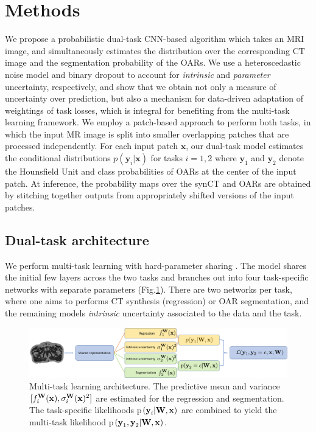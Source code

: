 \section{Methods}
We propose a probabilistic dual-task CNN-based algorithm which takes an MRI image, and simultaneously estimates the distribution over the corresponding CT image and the segmentation probability of the OARs. We use a heteroscedastic noise model and binary dropout to account for \textit{intrinsic} and \textit{parameter} uncertainty, respectively, and show that we obtain not only a measure of uncertainty over prediction, but also a mechanism for data-driven adaptation of weightings of task losses, which is integral for benefiting from the multi-task learning framework. We employ a patch-based approach to perform both tasks, in which the input MR image is split into smaller overlapping patches that are processed independently. For each input patch $\mathbf{x}$, our dual-task model estimates the conditional distributions $p(\mathbf{y}_i|\mathbf{x})$ for tasks $i=1,2$ where $\mathbf{y}_1$ and $\mathbf{y}_2$ denote the Hounsfield Unit and class probabilities of OARs at the center of the input patch. At inference, the probability maps over the synCT and OARs are obtained by stitching together outputs from appropriately shifted versions of the input patches.

\subsection{Dual-task architecture}
We perform multi-task learning with hard-parameter sharing \cite{Caruana1993MultitaskLA}. The model shares the initial few layers across the two tasks and branches out into four task-specific networks with separate parameters (Fig.\ref{fig:diagram}). There are two networks per task, where one aims to performs CT synthesis (regression) or OAR segmentation, and the remaining models \emph{intrinsic} uncertainty associated to the data and the task.
	\begin{figure}[!b]
		\centering
\includegraphics[height=0.185\textwidth]{chapter_5/figures/final_for_ryu_MT.pdf}
		\caption{Multi-task learning architecture. The predictive mean and variance $[f^{\mathbf{W}}_i(\text{\textbf{x}}), \sigma_{i}^{\mathbf{W}}(\text{\textbf{x}})^{2}]$ are estimated for the regression and segmentation. The task-specific likelihoods p$\left(\text{\textbf{y}}_{i}|\text{\textbf{W}},\text{\textbf{x}}\right)$ are combined to yield the multi-task likelihood p$\left(\text{\textbf{y}}_{1}, \text{\textbf{y}}_{2}|\text{\textbf{W}},\mathbf{x}\right)$.} 
		\label{fig:diagram}
	\end{figure}
    
